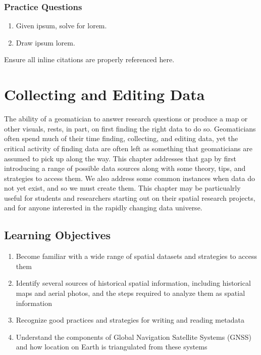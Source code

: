 \documentclass[
]{book}
\providecommand{\tightlist}{%
  \setlength{\itemsep}{0pt}\setlength{\parskip}{0pt}}
\begin{document}
\hypertarget{practice-questions-1}{%
\subsection*{Practice Questions}\label{practice-questions-1}}

\begin{enumerate}
\def\labelenumi{\arabic{enumi}.}
\tightlist
\item
  Given ipsum, solve for lorem.
\item
  Draw ipsum lorem.
\end{enumerate}

Ensure all inline citations are properly referenced here.

\hypertarget{collecting-and-editing-data}{%
\chapter{Collecting and Editing Data}\label{collecting-and-editing-data}}

The ability of a geomatician to answer research questions or produce a map or other visuals, rests, in part, on first finding the right data to do so. Geomaticians often spend much of their time finding, collecting, and editing data, yet the critical activity of finding data are often left as something that geomaticians are assumed to pick up along the way. This chapter addresses that gap by first introducing a range of possible data sources along with some theory, tips, and strategies to access them. We also address some common instances when data do not yet exist, and so we must create them. This chapter may be particualrly useful for students and researchers starting out on their spatial research projects, and for anyone interested in the rapidly changing data universe.

\hypertarget{learning-objectives-3}{%
\section*{Learning Objectives}\label{learning-objectives-3}}

\begin{enumerate}
\def\labelenumi{\arabic{enumi}.}
\tightlist
\item
  Become familiar with a wide range of spatial datasets and strategies to access them
\item
  Identify several sources of historical spatial information, including historical maps and aerial photos, and the steps required to analyze them as spatial information
\item
  Recognize good practices and strategies for writing and reading metadata
\item
  Understand the components of Global Navigation Satellite Systems (GNSS) and how location on Earth is triangulated from these systems
\end{enumerate}
\end{document}
